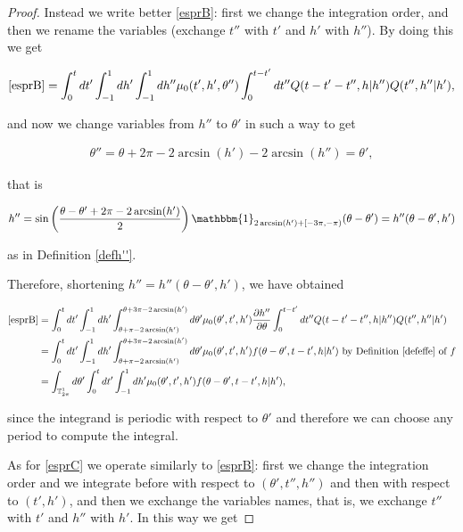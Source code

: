 \documentclass[a4paper,10pt,reqno]{amsart}
\numberwithin{equation}{subsection}
\numberwithin{figure}{subsection}
\begin{document}
\begin{proof}
Instead we write better \eqref{esprB}: first we change the integration order, and then we rename the variables (exchange $t''$ with $t'$ and $h'$ with $h''$). By doing this we get

\begin{align*}
\eqref{esprB}=\int_0^tdt'\int_{-1}^1dh'\int_{-1}^1dh''\mu_0(t',h',\theta'')\int_0^{t-t'}dt''Q(t-t'-t'',h|h'')Q(t'',h''|h'),
\end{align*}

and now we change variables from $h''$ to $\theta'$ in such a way to get

\begin{align*}
\theta''=\theta+2\pi-2\arcsin(h')-2\arcsin(h'')=\theta',
\end{align*}

that is

\begin{align*}
h''=\sin\left(\frac{\theta-\theta'+2\pi-2\arcsin(h')}{2}\right)\mathbbm{1}_{2\arcsin(h')+[-3\pi,-\pi)}(\theta-\theta')=h''(\theta-\theta',h')
\end{align*}

as in Definition \ref{defh''}.

Therefore, shortening $h''=h''(\theta-\theta',h')$, we have obtained

{\scriptsize\begin{align}
\nonumber \eqref{esprB}&=\int_0^tdt'\int_{-1}^1dh'\int_{\theta+\pi-2\arcsin(h')}^{\theta+3\pi-2\arcsin(h')}d\theta'\mu_0(\theta',t',h')\frac{\partial h''}{\partial\theta}\int_0^{t-t'}dt''Q(t-t'-t'',h|h'')Q(t'',h''|h')
\\
\nonumber&=\int_0^tdt'\int_{-1}^1dh'\int_{\theta+\pi-2\arcsin(h')}^{\theta+3\pi-2\arcsin(h')}d\theta'\mu_0(\theta',t',h')f(\theta-\theta',t-t',h|h')\textrm{ by Definition \ref{defeffe} of }f
\\
\label{nuovaB}&=\int_{\mathbb{T}^1_{2\pi}}d\theta'\int_0^tdt'\int_{-1}^1dh'\mu_0(\theta',t',h')f(\theta-\theta',t-t',h|h'),
\end{align}}

since the integrand is periodic with respect to $\theta'$ and therefore we can choose any period to compute the integral.

As for \eqref{esprC} we operate similarly to \eqref{esprB}: first we change the integration order and we integrate before with respect to $(\theta',t'',h'')$ and then with respect to $(t',h')$, and then we exchange the variables names, that is, we exchange $t''$ with $t'$ and $h''$ with $h'$. In this way we get


\end{proof}
\end{document}

